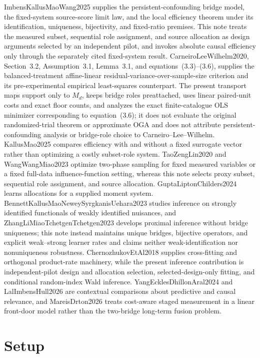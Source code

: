 \documentclass{article}
\begin{document}
ImbensKallusMaoWang2025 supplies the persistent-confounding bridge model, the fixed-system source-score limit law, and the local efficiency theorem under its identification, uniqueness, bijectivity, and fixed-ratio premises.  This note treats the measured subset, sequential role assignment, and source allocation as design arguments selected by an independent pilot, and invokes absolute causal efficiency only through the separately cited fixed-system result.  CarneiroLeeWilhelm2020, Section~3.2, Assumption~3.1, Lemma~3.1, and equations~(3.3)--(3.6), supplies the balanced-treatment affine-linear residual-variance-over-sample-size criterion and its pre-experimental empirical least-squares counterpart.  The present transport maps support only to \(M_d\), keeps bridge roles preattached, uses linear paired-unit costs and exact floor counts, and analyzes the exact finite-catalogue OLS minimizer corresponding to equation~(3.6); it does not evaluate the original randomized-trial theorem or approximate OGA and does not attribute persistent-confounding analysis or bridge-role choice to Carneiro--Lee--Wilhelm.  KallusMao2025 compares efficiency with and without a fixed surrogate vector rather than optimizing a costly subset-role system.  TaoZengLin2020 and WangWangMiao2023 optimize two-phase sampling for fixed measured variables or a fixed full-data influence-function setting, whereas this note selects proxy subset, sequential role assignment, and source allocation.  GuptaLiptonChilders2024 learns allocations for a supplied moment system.  BennettKallusMaoNeweySyrgkanisUehara2023 studies inference on strongly identified functionals of weakly identified nuisances, and ZhangLiMiaoTchetgenTchetgen2023 develops proximal inference without bridge uniqueness; this note instead maintains unique bridges, bijective operators, and explicit weak--strong learner rates and claims neither weak-identification nor nonuniqueness robustness.  ChernozhukovEtAl2018 supplies cross-fitting and orthogonal product-rate machinery, while the present inference contribution is independent-pilot design and allocation selection, selected-design-only fitting, and conditional random-index Wald inference.  YangEcklesDhillonAral2024 and LalImbensHull2026 are contextual comparisons about predictive and causal relevance, and MareisDrton2026 treats cost-aware staged measurement in a linear front-door model rather than the two-bridge long-term fusion problem.

\section{Setup}
\end{document}
